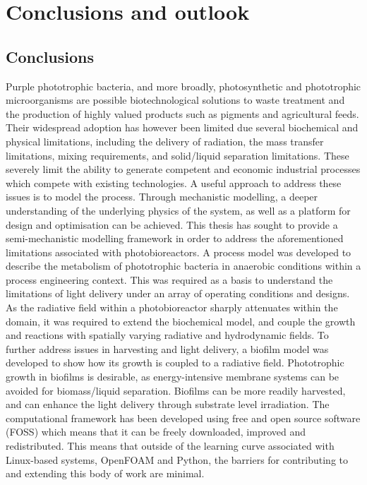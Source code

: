 \chapter[Conclusions and outlook]{Conclusions and outlook}
\label{chap:conclusion}

\section{Conclusions}
Purple phototrophic bacteria, and more broadly, photosynthetic and phototrophic microorganisms are possible biotechnological solutions to waste treatment and the production of highly valued products such as pigments and agricultural feeds. Their widespread adoption has however been limited due several biochemical and physical limitations, including the delivery of radiation, the mass transfer limitations, mixing requirements, and solid/liquid separation limitations. These severely limit the ability to generate competent and economic industrial processes which compete with existing technologies. 
\skippingparagraph
A useful approach to address these issues is to model the process. Through mechanistic modelling, a deeper understanding of the underlying physics of the system, as well as a platform for design and optimisation can be achieved. This thesis has sought to provide a semi-mechanistic modelling framework in order to address the aforementioned limitations associated with photobioreactors. A process model was developed to describe the metabolism of phototrophic bacteria in anaerobic conditions within a process engineering context. This was required as a basis to understand the limitations of light delivery under an array of operating conditions and designs. As the radiative field within a photobioreactor sharply attenuates within the domain, it was required to extend the biochemical model, and couple the growth and reactions with spatially varying radiative and hydrodynamic fields. 
To further address issues in harvesting and light delivery, a biofilm model was developed to show how its growth is coupled to a radiative field. Phototrophic growth in biofilms is desirable, as energy-intensive membrane systems can be avoided for biomass/liquid separation. Biofilms can be more readily harvested, and can enhance the light delivery through substrate level irradiation. The computational framework has been developed using free and open source software (FOSS) which means that it can be freely downloaded, improved and redistributed. This means that outside of the learning curve associated with Linux-based systems, OpenFOAM and Python, the barriers for contributing to and extending this body of work are minimal.

